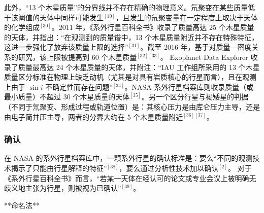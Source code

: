 此外，“13 个木星质量”的分界线并不存在精确的物理意义。氘聚变在某些质量低于该阈值的天体中同样可能发生$^{[10]}$，且发生的氘聚变量在一定程度上取决于天体的化学组成$^{[30]}$。2011 年，《系外行星百科全书》收录了质量高达 25 个木星质量的天体，并指出：“在观测到的质量谱中，13 个木星质量附近并不存在特殊特征，这进一步强化了放弃该质量上限的选择”$^{[31]}$。截至 2016 年，基于对质量—密度关系的研究，该上限被提高到 60 个木星质量$^{[32][33]}$。
Exoplanet Data Explorer 收录了质量最高达 24 个木星质量的天体，并附注：“IAU 工作组所采用的 13 个木星质量区分标准在物理上缺乏动机（尤其是对具有岩质核心的行星而言），且在观测上由于 $\sin i$ 不确定性而存在问题”$^{[34]}$。NASA 系外行星档案库则收录质量（或最小质量）不超过 30 个木星质量的天体$^{[35]}$。另一个区分行星与褐矮星的判据（不同于氘聚变、形成过程或轨道位置）是：其核心压力是由库仑压力主导，还是由电子简并压主导，两者的分界大约在 5 个木星质量附近$^{[36][37]}$。
\subsubsection{确认}
在 NASA 的系外行星档案库中，一颗系外行星的确认标准是：要么“不同的观测技术揭示了只能由行星解释的特征”$^{[38]}$，要么通过分析性技术加以确认$^{[2]}$。
对于《系外行星百科全书》而言，“若某一天体在经认可的论文或专业会议上被明确无歧义地主张为行星，则被视为已确认”$^{[39]}$。

**命名法**
